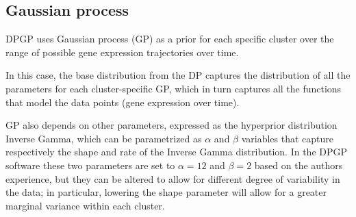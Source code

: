 \subsection{Gaussian process}
DPGP uses Gaussian process (GP) as a prior for each specific cluster over the range of possible gene expression trajectories over time.

In this case, the base distribution from the DP captures the distribution of all the parameters for each cluster-specific GP, which in turn captures all the functions that model the data points (gene expression over time).

GP also depends on other parameters, expressed as the hyperprior distribution Inverse Gamma, which can be parametrized as $\alpha$ and $\beta$ variables that capture respectively the shape and rate of the Inverse Gamma distribution. In the DPGP software these two parameters are set to $\alpha=12$ and $\beta=2$ based on the authors experience, but they can be altered to allow for different degree of variability in the data; in particular, lowering the shape parameter will allow for a greater marginal variance within each cluster.
